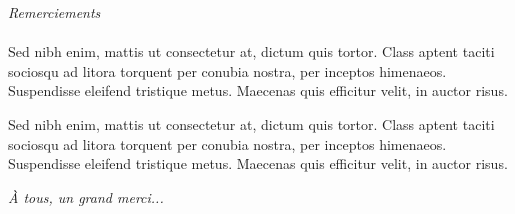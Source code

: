  

\begin{center}
\huge{\emph{Remerciements}}
\end{center}

\vspace{1cm}

\paragraph{}
Sed nibh enim, mattis ut consectetur at, dictum quis tortor. Class aptent taciti sociosqu ad litora torquent per conubia nostra, per inceptos himenaeos. Suspendisse eleifend tristique metus. Maecenas quis efficitur velit, in auctor risus. 

Sed nibh enim, mattis ut consectetur at, dictum quis tortor. Class aptent taciti sociosqu ad litora torquent per conubia nostra, per inceptos himenaeos. Suspendisse eleifend tristique metus. Maecenas quis efficitur velit, in auctor risus. 


\begin{center}
	\textit{À tous, un grand merci...}
\end{center}


